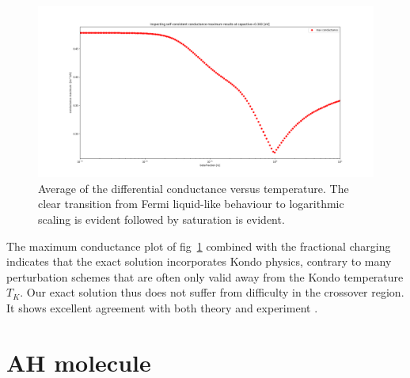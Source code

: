 \documentclass{article}
\begin{document}
\begin{multicols}{2}
        \begin{figure}[b]
            \centering
            \includegraphics[width=\textwidth]{fig/figure_5.png}
            \caption{\label{fig:conductance} Average of the differential conductance versus temperature. The clear transition from Fermi liquid-like behaviour to logarithmic scaling is evident followed by saturation is evident.}
        \end{figure}
        
        The maximum conductance plot of fig~\ref{fig:conductance} combined with the fractional charging indicates that the exact solution incorporates Kondo physics, contrary to many perturbation schemes that are often only valid away from the Kondo temperature $T_K$. Our exact solution thus does not suffer from difficulty in the crossover region. It shows excellent agreement with both theory and experiment \cite{Sasaki2000}. 
         
    \section{AH molecule}\label{sec:ahmolecule}
        

\end{multicols}
\end{document}
